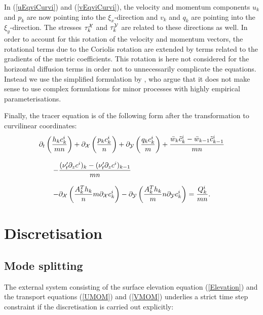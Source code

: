In (\ref{uEqviCurvi}) and (\ref{vEqviCurvi}),
the velocity and momentum components $u_k$ and $p_k$
are now pointing into the $\xi_x$-direction and $v_k$ and $q_k$
are pointing into the $\xi_y$-direction. 
The stresses $\tau^{\cal X}_k$ and $\tau^{\cal Y}_k$
are related to these directions as well. 
In order to account for this rotation of the velocity and momentum vectors,
the rotational terms due to the Coriolis rotation are extended by 
terms related to the gradients of the metric coefficients. 
This rotation is here not considered for the horizontal diffusion terms in 
order not to unnecessarily complicate the equations. Instead we 
use the simplified formulation by \cite{KANTHAea00b}, who argue
that it does not make sense to use complex formulations for minor
processes with highly empirical parameterisations.  

Finally, the tracer equation is of the following form after
the transformation to curvilinear coordinates: 
\begin{equation}\label{C_Layer_IntCurvi}
\begin{array}{l}
\displaystyle
\partial_t \left(\frac{h_k c^i_k}{mn}\right) 
+ \partial_{\cal X} \left(\frac{p_kc^i_k}{n}\right)
+\partial_{\cal Y} \left(\frac{q_k c^i_k}{m}\right)
+\frac{\bar w_k \tilde c^i_k - \bar w_{k-1} \tilde c^i_{k-1}}{mn}\\
\\ \qquad
\displaystyle
-\frac{(\nu'_t\partial_z c^i)_{k}
-(\nu'_t\partial_z c^i)_{k-1}}{mn}
\\ \\ \qquad
\displaystyle
-\partial_{\cal X}\left(\frac{A_k^Th_k}{n} m\partial_{\cal X}c^i_k\right)
-\partial_{\cal Y}\left(\frac{A_k^Th_k}{m} n\partial_{\cal Y}c^i_k\right)
=\frac{Q^i_k}{mn}.
\end{array}
\end{equation}

\section{Discretisation}\label{Section_discretisation}

\subsection{Mode splitting}\label{Section_mode_splitting}

The external system consisting of the surface elevation equation
(\ref{Elevation}) and the transport equations (\ref{UMOM}) and
(\ref{VMOM}) underlies a strict time step constraint if the
discretisation is carried out explicitly:

